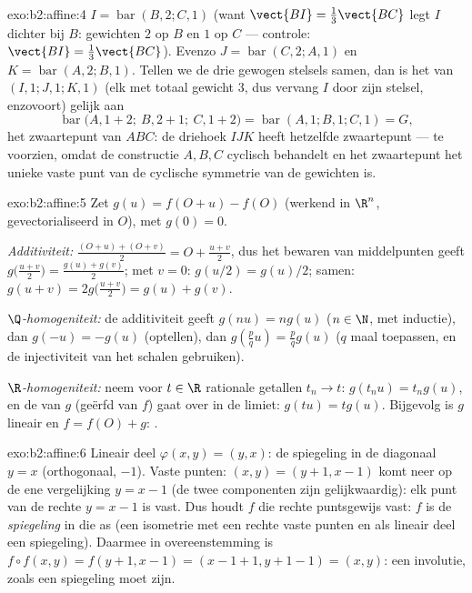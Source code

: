 \begin{solution}{exo:b2:affine:4}
$I = \operatorname{bar}(B, 2; C, 1)$ (want $\vect{BI} =
\frac13\vect{BC}$ legt $I$ dichter bij $B$: gewichten $2$ op $B$ en
$1$ op $C$ --- controle: $\vect{BI} = \frac{1}{3}\vect{BC}$).
Evenzo $J = \operatorname{bar}(C, 2; A, 1)$ en $K =
\operatorname{bar}(A, 2; B, 1)$. Tellen we de drie gewogen stelsels
samen, dan is het  van $(I, 1; J, 1; K, 1)$ (elk met
totaal gewicht $3$, dus vervang $I$ door zijn stelsel,
enzovoort) gelijk aan
\[
\operatorname{bar}\bigl(A, 1 + 2;\ B, 2 + 1;\ C, 1 + 2\bigr)
= \operatorname{bar}(A, 1; B, 1; C, 1) = G ,
\]
het zwaartepunt van $ABC$: de driehoek $IJK$ heeft hetzelfde
zwaartepunt --- te voorzien, omdat de constructie $A, B, C$
cyclisch behandelt en het zwaartepunt het unieke vaste punt van de
cyclische symmetrie van de gewichten is.
\end{solution}

\begin{solution}{exo:b2:affine:5}
Zet $g(u) = f(O + u) - f(O)$ (werkend in $\R^n$, gevectorialiseerd
in $O$), met $g(0) = 0$.

\emph{Additiviteit:} $\frac{(O + u) + (O + v)}{2} = O + \frac{u +
v}{2}$, dus het bewaren van middelpunten geeft
$g\bigl(\frac{u+v}{2}\bigr) = \frac{g(u) + g(v)}{2}$; met $v = 0$:
$g(u/2) = g(u)/2$; samen: $g(u + v) = 2g\bigl(\frac{u+v}{2}\bigr) =
g(u) + g(v)$.

\emph{$\Q$-homogeniteit:} de additiviteit geeft $g(nu) = ng(u)$ ($n
\in \N$, met inductie), dan $g(-u) = -g(u)$ (optellen), dan
$g(\frac pq u) = \frac pq g(u)$ ($q$ maal toepassen, en de
injectiviteit van het schalen gebruiken).

\emph{$\R$-homogeniteit:} neem voor $t \in \R$ rationale getallen
$t_n \to t$: $g(t_nu) = t_ng(u)$, en de  van $g$
(geërfd van $f$) gaat over in de limiet: $g(tu) = tg(u)$. Bijgevolg
is $g$ lineair en $f = f(O) + g$: .
\end{solution}

\begin{solution}{exo:b2:affine:6}
Lineair deel $\varphi(x,y) = (y, x)$: de spiegeling in de diagonaal
$y = x$ (orthogonaal,  $-1$). Vaste punten: $(x, y) = (y
+ 1, x - 1)$ komt neer op de ene vergelijking $y = x - 1$ (de twee
componenten zijn gelijkwaardig): elk punt van de rechte $y = x - 1$
is vast. Dus houdt $f$ die rechte puntsgewijs vast: $f$ is de
\emph{spiegeling} in die as (een isometrie met een rechte vaste
punten en als lineair deel een spiegeling). Daarmee in
overeenstemming is $f \circ f(x,y) = f(y+1, x-1) = (x - 1 + 1, y +
1 - 1) = (x, y)$: een involutie, zoals een spiegeling moet zijn.
\end{solution}

